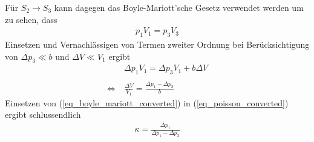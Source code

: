 \documentclass[12pt,a4paper,german]{scrartcl}
\numberwithin{equation}{section}
\begin{document}
  Für $S_2 \rightarrow S_3$ kann dagegen das Boyle-Mariott'sche Gesetz verwendet werden um zu sehen, dass
  \begin{align}
    p_1 V_1 = p_3 V_3
    \label{eq_theo_boyle_mariott}
  \end{align}
  Einsetzen und Vernachlässigen von Termen zweiter Ordnung bei Berücksichtigung von $\Delta p_3 \ll b$ und $\Delta V \ll V_1$ ergibt
  \begin{align}
    &\Delta p_1 V_1 = \Delta p_3 V_1 + b \Delta V \nonumber \\
    \nonumber \\
    \Leftrightarrow \ &\frac{\Delta V}{V_1} = \frac{\Delta p_1 - \Delta p_3}{b}
    \label{eq_boyle_mariott_converted}
  \end{align}
  Einsetzen von (\ref{eq_boyle_mariott_converted}) in (\ref{eq_poisson_converted}) ergibt schlussendlich
  \begin{align}
    \kappa = \frac{\Delta p_1}{\Delta p_1 - \Delta p_3}
    \label{eq_theo_kappa_clement_desormes}
  \end{align}
\end{document}
